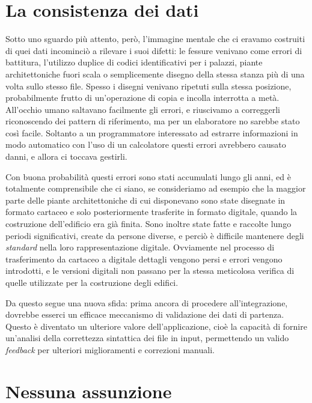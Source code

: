 \documentclass[12pt]{report}
\begin{document}
\section{La consistenza dei dati}

Sotto uno sguardo più attento, però, l'immagine mentale che ci eravamo costruiti di quei dati incominciò a rilevare i suoi difetti: le fessure venivano come errori di battitura, l'utilizzo duplice di codici identificativi per i palazzi, piante architettoniche fuori scala o semplicemente disegno della stessa stanza più di una volta sullo stesso file. Spesso i disegni venivano ripetuti sulla stessa posizione, probabilmente frutto di un'operazione di copia e incolla interrotta a metà. All'occhio umano saltavano facilmente gli errori, e riuscivamo a correggerli riconoscendo dei pattern di riferimento, ma per un elaboratore no sarebbe stato così facile. Soltanto a un programmatore interessato ad estrarre informazioni in modo automatico con l'uso di un calcolatore questi errori avrebbero causato danni, e allora ci toccava gestirli.

Con buona probabilità questi errori sono stati accumulati lungo gli anni, ed è totalmente comprensibile che ci siano, se  consideriamo ad esempio che la maggior parte delle piante architettoniche di cui disponevano sono state disegnate in formato cartaceo e solo posteriormente trasferite in formato digitale, quando la costruzione dell'edificio era già finita. Sono inoltre state fatte e raccolte lungo periodi significativi, create da persone diverse, e perciò è difficile mantenere degli \textit{standard} nella loro rappresentazione digitale. Ovviamente nel processo di trasferimento da cartaceo a digitale dettagli vengono persi e errori vengono introdotti, e le versioni digitali non passano per la stessa meticolosa verifica di quelle utilizzate per la costruzione degli edifici. 

Da questo segue una nuova sfida: prima ancora di procedere all'integrazione, dovrebbe esserci un efficace meccanismo di validazione dei dati di partenza. Questo è diventato un ulteriore valore dell'applicazione, cioè la capacità di fornire un'analisi della correttezza sintattica dei file in input, permettendo un valido \textit{feedback} per ulteriori miglioramenti e correzioni manuali.

\section*{Nessuna assunzione}
\end{document}
